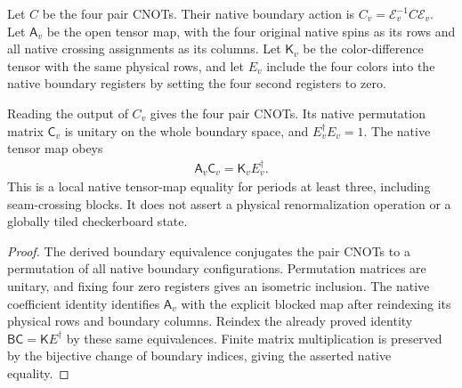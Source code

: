 \begin{definition}%
    \label{def:peps_kitaev_native_boundary_cnot}
    \leanok
    Let $C$ be the four pair CNOTs. Their native boundary action is
    $C_v=\mathcal E_v^{-1}C\mathcal E_v$.
    Let $\mathsf A_v$ be the open tensor map, with the four original
    native spins as its rows and all native crossing assignments as its columns.
    Let $\mathsf K_v$ be the color-difference tensor with the same physical
    rows, and let $E_v$ include the four colors into the native boundary
    registers by setting the four second registers to zero.
\end{definition}

\begin{lemma}%
    \label{thm:peps_kitaev_native_boundary_cnot}
    \leanok
    Reading the output of $C_v$ gives the four pair CNOTs. Its native
    permutation matrix $\mathsf C_v$ is unitary on the whole boundary space,
    and $E_v^\dagger E_v=1$. The native tensor map obeys
    \begin{align}
        \mathsf A_v\mathsf C_v=\mathsf K_v E_v^\dagger.
    \end{align}
    This is a local native tensor-map equality for periods at least three,
    including seam-crossing blocks. It does not assert a physical
    renormalization operation or a globally tiled checkerboard state.
\end{lemma}

\begin{proof}\leanok
    The derived boundary equivalence conjugates the pair CNOTs to a
    permutation of all native boundary configurations. Permutation matrices
    are unitary, and fixing four zero registers gives an isometric inclusion.
    The native coefficient identity identifies $\mathsf A_v$ with the
    explicit blocked map after reindexing its physical rows and boundary
    columns. Reindex the already proved identity
    $\mathsf B\mathsf C=\mathsf K E^\dagger$ by these same equivalences.
    Finite matrix multiplication is preserved by the bijective change of
    boundary indices, giving the asserted native equality.
\end{proof}
